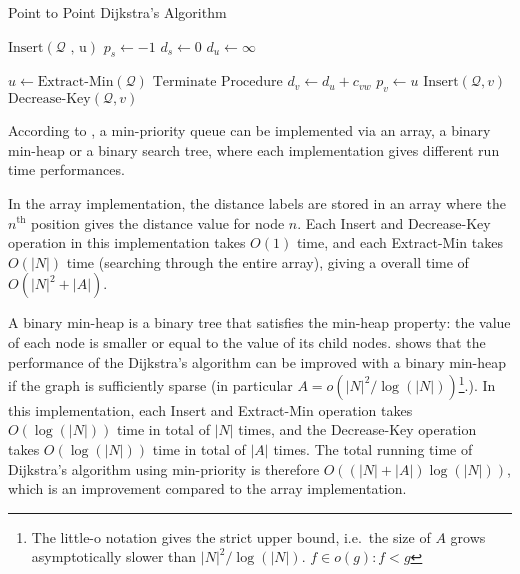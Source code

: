 \begin{algorithm}[!ht]
    \caption{Point to Point Dijkstra's Algorithm}
    \label{algo:p2pdijkstra}
    \begin{algorithmic}[1]
        \State $\text{Insert}(\mathcal{Q}\text{ , u})$ 
        \State $p_s \gets -1$ 
        \State $d_s \gets 0$
         
        \State $d_u \gets \infty$
    \EndFor

    \State $ u \gets \text{Extract-Min}(\mathcal{Q}) $ 
    \State $\text{Terminate Procedure}$ 
\EndIf
 
\State $d_v \gets d_u + c_{vw}$
\State $p_v \gets u$
\State $\text{Insert}(\mathcal{Q}, v)$ 
\Else
\State $\text{Decrease-Key}(\mathcal{Q}, v)$ 
    \EndIf
\EndIf
                \EndFor
            \EndIf
        \EndWhile
    \EndProcedure
\end{algorithmic}
\end{algorithm}

According to \citet{Cormen},
a min-priority queue can be implemented via an array, a binary min-heap or a binary search tree,
where each implementation gives different run time performances.

In the array implementation,
the distance labels are stored in an array where the $n^{\text{th}}$ position gives the distance value for node $n$.
Each Insert and Decrease-Key operation in this implementation takes $O(1)$ time, and each Extract-Min takes $O(|N|)$ time (searching through the entire array), giving a overall time of $O(|N|^2 + |A|)$.

A binary min-heap is a binary tree that satisfies the min-heap property:
the value of each node is smaller or equal to the value of its child nodes.
\citet{Cormen} shows that the performance of the Dijkstra's algorithm can be improved with a binary min-heap if the graph is sufficiently sparse (in particular $A = o(|N|^2/\log(|N|))$\footnote{The little-o notation gives the strict upper bound, i.e.\ the size of $A$ grows asymptotically slower than $|N|^2/\log(|N|)$. $f \in o(g) : f < g$}.).
In this implementation, each Insert and Extract-Min operation takes $O(\log(|N|))$ time in total of $|N|$ times,
and the Decrease-Key operation takes $O(\log(|N|))$ time in total of $|A|$ times.
The total running time of Dijkstra's algorithm using min-priority is therefore $O((|N|+|A|)\log(|N|))$,
which is an improvement compared to the array implementation.

